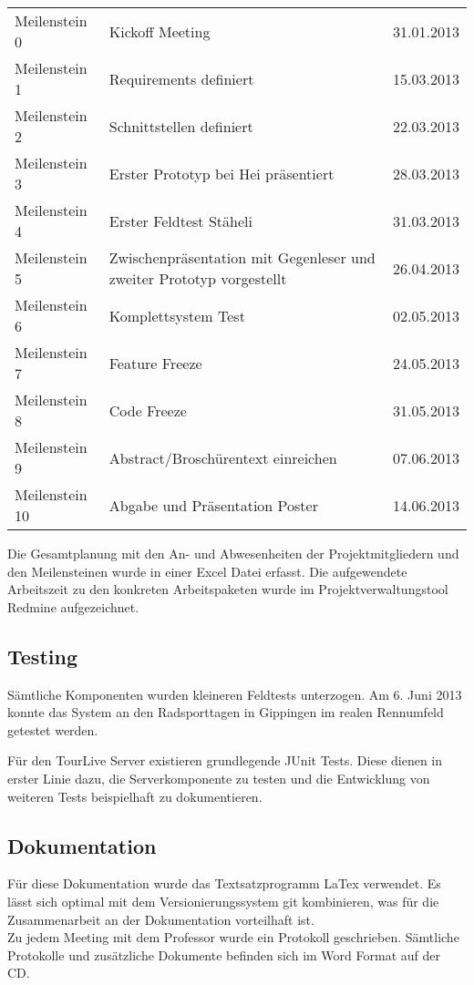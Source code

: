\begin{tabular}{p{2.8cm}p{7.5cm}r}
Meilenstein 0 & Kickoff Meeting & 31.01.2013\\
Meilenstein 1 & Requirements definiert & 15.03.2013\\
Meilenstein 2 & Schnittstellen definiert & 22.03.2013\\
Meilenstein 3 & Erster Prototyp bei Hei präsentiert & 28.03.2013\\
Meilenstein 4 & Erster Feldtest Stäheli & 31.03.2013\\
Meilenstein 5 & Zwischenpräsentation mit Gegenleser und zweiter Prototyp vorgestellt & 26.04.2013\\
Meilenstein 6 & Komplettsystem Test & 02.05.2013\\
Meilenstein 7 & Feature Freeze & 24.05.2013\\
Meilenstein 8 & Code Freeze & 31.05.2013\\
Meilenstein 9 & Abstract/Broschürentext einreichen & 07.06.2013\\
Meilenstein 10 & Abgabe und Präsentation Poster & 14.06.2013\\
\end{tabular}

Die Gesamtplanung mit den An- und Abwesenheiten der Projektmitgliedern und den Meilensteinen wurde in einer Excel Datei erfasst. Die aufgewendete Arbeitszeit zu den konkreten Arbeitspaketen wurde im Projektverwaltungstool Redmine aufgezeichnet.
\\

\subsection{Testing}
Sämtliche Komponenten wurden kleineren Feldtests unterzogen. Am 6. Juni 2013 konnte das System an den Radsporttagen in Gippingen im realen Rennumfeld getestet werden.


Für den TourLive Server existieren grundlegende JUnit Tests. Diese dienen in erster Linie dazu, die Serverkomponente zu testen und die Entwicklung von weiteren Tests beispielhaft zu dokumentieren.

\subsection{Dokumentation}
Für diese Dokumentation wurde das Textsatzprogramm LaTex verwendet. Es lässt sich optimal mit dem Versionierungssystem git kombinieren, was für die Zusammenarbeit an der Dokumentation vorteilhaft ist.
\\

Zu jedem Meeting mit dem Professor wurde ein Protokoll geschrieben. Sämtliche Protokolle und zusätzliche Dokumente befinden sich im Word Format auf der CD.